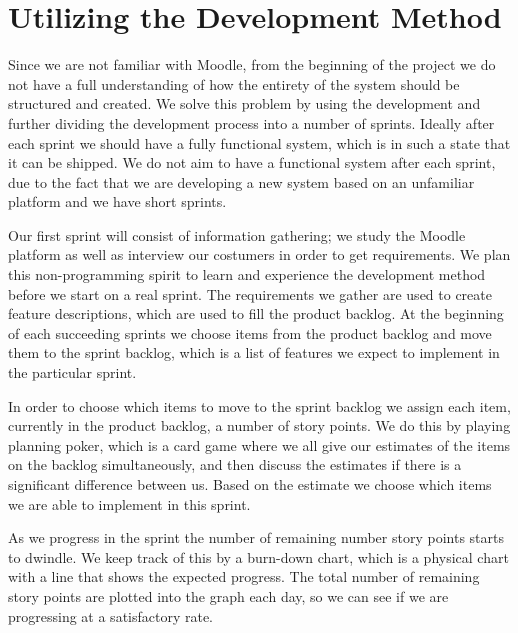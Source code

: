 \section{Utilizing the Development Method} %
Since we are not familiar with Moodle, from the beginning of the project we do not have a full understanding of how the entirety of the system should be structured and created.
We solve this problem by using the development \scrum{} and further dividing the development process into a number of sprints.
Ideally after each sprint we should have a fully functional system, which is in such a state that it can be shipped.
We do not aim to have a functional system after each sprint, due to the fact that we are developing a new system based on an unfamiliar platform and we have short sprints. 


Our first sprint will consist of information gathering; we study the Moodle platform as well as interview our costumers in order to get requirements. 
We plan this non-programming spirit to learn and experience the \scrum{} development method before we start on a real sprint.
The requirements we gather are used to create feature descriptions, which are used to fill the product backlog.
At the beginning of each succeeding sprints we choose items from the product backlog and move them to the sprint backlog, which is a list of features we expect to implement in the particular sprint.

In order to choose which items to move to the sprint backlog we assign each item, currently in the product backlog, a number of story points.
We do this by playing planning poker, which is a card game where we all give our estimates of the items on the backlog simultaneously, and then discuss the estimates if there is a significant difference between us.
Based on the estimate we choose which items we are able to implement in this sprint.

As we progress in the sprint the number of remaining number story points starts to dwindle. 
We keep track of this by a burn-down chart, which is a physical chart with a line that shows the expected progress.
The total number of remaining story points are plotted into the graph each day, so we can see if we are progressing at a satisfactory rate.

